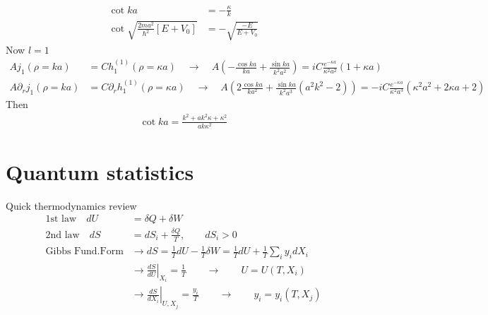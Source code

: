 \documentclass[../main.tex]{subfiles}
\begin{document}
\begin{align}
\cot ka&=-\frac{\kappa}{k}\\
\cot\sqrt{\frac{2ma^2}{\hbar^2}[E+V_0]}&=-\sqrt{\frac{-E}{E+V_0}}
\end{align}
Now $l=1$
\begin{align}
Aj_1(\rho=ka)&=Ch^{(1)}_1(\rho=\kappa a)\quad\rightarrow\quad A\left(-\frac{\cos ka}{ka}+\frac{\sin ka}{k^2a^2}\right)=iC\frac{e^{-\kappa a}}{\kappa^2 a^2}(1+\kappa a)\\
A\partial_r j_1(\rho=ka)&=C\partial_r h^{(1)}_1(\rho=\kappa a)\quad\rightarrow\quad A\left(2\frac{\cos ka}{ka^2}+\frac{\sin ka}{k^2a^3}(a^2k^2-2)\right)=-iC\frac{e^{-\kappa a}}{\kappa^2 a^3}(\kappa^2 a^2+2\kappa a +2)
\end{align}
Then
\begin{align}
\cot ka=\frac{k^2+ak^2\kappa+\kappa^2}{ak\kappa^2}
\end{align}




\section{Quantum statistics}
Quick thermodynamics review
\begin{align}
\text{1st law}\quad dU&=\delta Q+\delta W\\
\text{2nd law}\quad dS&=dS_i+\frac{\delta Q}{T}, \qquad dS_i>0\\
\text{Gibbs Fund.Form}&\rightarrow dS=\frac{1}{T}dU-\frac{1}{T}\delta W=\frac{1}{T}dU+\frac{1}{T}\sum_i y_idX_i\\
&\rightarrow \left.\frac{dS}{dU}\right|_{X_i}=\frac{1}{T}\qquad\rightarrow\qquad U=U(T,X_i)\\
&\rightarrow \left.\frac{dS}{dX_i}\right|_{U,X_j}=\frac{y_i}{T}\qquad\rightarrow\qquad y_i=y_i(T,X_j)
\end{align}
\end{document}
